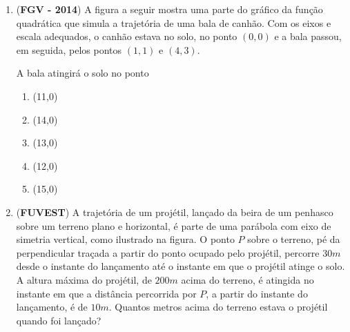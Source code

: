 {\begin{enumerate}
\needspace{10em}
\item (\textbf{FGV - 2014}) A figura a seguir mostra uma parte do gráfico da função quadrática que simula a trajetória de uma bala de canhão. Com os eixos e escala adequados, o canhão estava no solo, no ponto \((0,0)\) e a bala passou, em seguida, pelos pontos \((1,1)\) e \((4,3)\).
\begin{center}\end{center}
A bala atingirá o solo no ponto
\begin{enumerate}
\item (11,0)
\item (14,0)
\item (13,0)
\item (12,0)
\item (15,0)
\end{enumerate}

\item (\textbf{FUVEST}) A trajetória de um projétil, lançado da beira de um penhasco sobre um terreno plano e horizontal, é parte de uma parábola com eixo de simetria vertical, como ilustrado na figura. O ponto \(P\) sobre o terreno, pé da perpendicular traçada a partir do ponto ocupado pelo projétil, percorre \(30m\) desde o instante do lançamento até o instante em que o projétil atinge o solo. A altura máxima do projétil, de \(200m\) acima do terreno, é atingida no instante
em que a distância percorrida por \(P\), a partir do instante do lançamento, é de \(10m\). Quantos metros acima do terreno estava o projétil quando foi lançado?

\begin{figure}[H]
\centering
\capstart


\end{figure}
\end{enumerate}}
